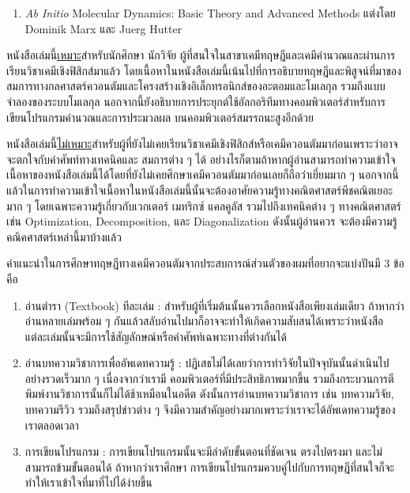 {\begin{enumerate}[topsep=0pt,noitemsep]
    \item \textit{Ab Initio} Molecular Dynamics: Basic Theory and Advanced Methods
    แต่งโดย Dominik Marx และ Juerg Hutter\autocite{marx2009}
    
\end{enumerate}

หนังสือเล่มนี้\underline{เหมาะ}สำหรับนักศึกษา นักวิจัย ผู้ที่สนใจในสาขาเคมีทฤษฎีและเคมีคำนวณและผ่านการเรียนวิชาเคมีเชิงฟิสิกส์มาแล้ว 
โดยเนื้อหาในหนังสือเล่มนี้เน้นไปที่การอธิบายทฤษฎีและพิสูจน์ที่มาของสมการทางกลศาสตร์ควอนตัมและโครงสร้างเชิงอิเล็กทรอนิกส์ของอะตอมและโมเลกุล%
รวมถึงแบบจำลองของระบบโมเลกุล นอกจากนี้ยังอธิบายการประยุกต์ใช้อัลกอริทึมทางคอมพิวเตอร์สำหรับการเขียนโปรแกรมคำนวณและการประมวลผล%
บนคอมพิวเตอร์สมรรถนะสูงอีกด้วย

หนังสือเล่มนี้\underline{ไม่เหมาะ}สำหรับผู้ที่ยังไม่เคยเรียนวิชาเคมีเชิงฟิสิกส์หรือเคมีควอนตัมมาก่อนเพราะว่าอาจจะตกใจกับคำศัพท์ทางเทคนิคและ%
สมการต่าง ๆ ได้ อย่างไรก็ตามถ้าหากผู้อ่านสามารถทำความเข้าใจเนื้อหาของหนังสือเล่มนี้ได้โดยที่ยังไม่เคยศึกษาเคมีควอนตัมมาก่อนเลยก็ถือว่าเยี่ยมมาก ๆ 
นอกจากนี้แล้วในการทำความเข้าใจเนื้อหาในหนังสือเล่มนี้นั้นจะต้องอาศัยความรู้ทางคณิตศาสตร์พีชคณิตเยอะมาก ๆ โดยเฉพาะความรู้เกี่ยวกับเวกเตอร์ 
เมทริกซ์ แคลคูลัส รวมไปถึงเทคนิคต่าง ๆ ทางคณิตศาสตร์ เช่น Optimization, Decomposition, และ Diagonalization ดังนั้นผู้อ่านควร%
จะต้องมีความรู้คณิคศาสตร์เหล่านี้มาบ้างแล้ว

คำแนะนำในการศึกษาทฤษฎีทางเคมีควอนตัมจากประสบการณ์ส่วนตัวของผมที่อยากจะแบ่งปันมี 3 ข้อคือ 

\begin{enumerate}[topsep=0pt,noitemsep]
    \setlength\itemsep{1em}
    \item อ่านตำรา (Textbook) ทีละเล่ม : สำหรับผู้ที่เริ่มต้นนั้นควรเลือกหนังสือเพียงเล่มเดียว ถ้าหากว่าอ่านหลายเล่มพร้อม ๆ 
    กันแล้วสลับอ่านไปมาก็อาจจะทำให้เกิดความสับสนได้เพราะว่าหนังสือแต่ละเล่มนั้นจะมีการใช้สัญลักษณ์หรือคำศัพท์เฉพาะทางที่ต่างกันได้
    
    \item อ่านบทความวิชาการเพื่ออัพเดทความรู้ : ปฏิเสธไม่ได้เลยว่าการทำวิจัยในปัจจุบันนั้นดำเนินไปอย่างรวดเร็วมาก ๆ เนื่องจากว่าเรามี%
    คอมพิวเตอร์ที่มีประสิทธิภาพมากขึ้น รวมถึงกระบวนการตีพิมพ์งานวิชาการนั้นก็ไม่ได้ช้าเหมือนในอดีต ดังนั้นการอ่านบทความวิชาการ เช่น 
    บทความวิจัย, บทความรีวิว รวมถึงสรุปข่าวต่าง ๆ จึงมีความสำคัญอย่างมากเพราะว่าเราจะได้อัพเดทความรู้ของเราตลอดเวลา

    \item การเขียนโปรแกรม : การเขียนโปรแกรมนั้นจะมีลำดับขั้นตอนที่ชัดเจน ตรงไปตรงมา และไม่สามารถข้ามขั้นตอนได้ ถ้าหากว่าเราศึกษา%
    การเขียนโปรแกรมควบคู่ไปกับการทฤษฎีที่สนใจก็จะทำให้เราเข้าใจที่มาที่ไปได้ง่ายขึ้น
\end{enumerate}

}
